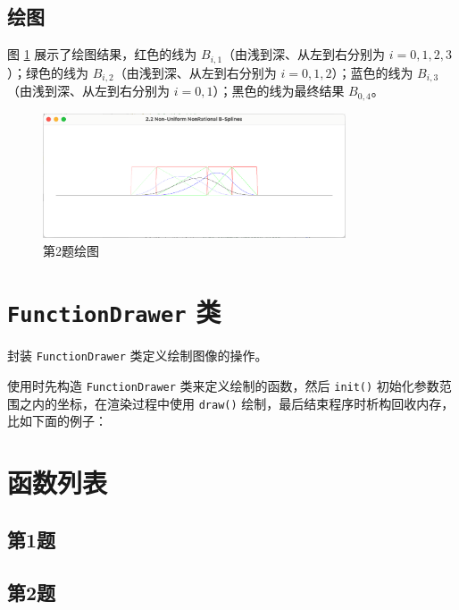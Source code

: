 \documentclass[math-font=newcm]{sjtuarticle}
\providecommand{\code}[2]{}
\providecommand{\codeRange}[4]{}
\begin{document}
\subsection{绘图}

图 \ref{fig:p2} 展示了绘图结果，红色的线为 $B_{i,1}$（由浅到深、从左到右分别为 $i=0,1,2,3$）；绿色的线为 $B_{i,2}$（由浅到深、从左到右分别为 $i=0,1,2$）；蓝色的线为 $B_{i,3}$（由浅到深、从左到右分别为 $i=0,1$）；黑色的线为最终结果 $B_{0,4}$。

\begin{figure}[h]
    \centering
    \includegraphics[width=0.8\textwidth]{p2.png}
    \caption{第2题绘图}
    \label{fig:p2}
\end{figure}

\appendix

\section{\texttt{FunctionDrawer} 类}

封装 \texttt{FunctionDrawer} 类定义绘制图像的操作。

\code{../source/p1/src/FunctionDrawer.h}{c++}

使用时先构造 \texttt{FunctionDrawer} 类来定义绘制的函数，然后 \texttt{init()} 初始化参数范围之内的坐标，在渲染过程中使用 \texttt{draw()} 绘制，最后结束程序时析构回收内存，比如下面的例子：

\codeRange{../source/p1/src/main.cpp}{c++}{43}{71}

\section{函数列表}

\subsection{第1题}

\code{../source/p1/src/MyFunctions.h}{c++}

\subsection{第2题}
\end{document}
